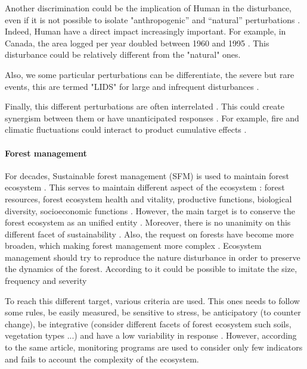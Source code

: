 \documentclass{article}
\begin{document}
Another discrimination could be the implication of Human in the disturbance, even if it is not possible to isolate "anthropogenic” and “natural” perturbations \cite{perera2015simulation}.
Indeed, Human have a direct impact increasingly important. For example, in Canada, the area logged per year doubled between 1960 and  1995 \cite{smith_canadas_2000}. This disturbance could be relatively different from the "natural" ones.

Also, we some particular perturbations can be differentiate, the severe but rare events, this are termed "LIDS" for large and infrequent disturbances \cite{foster1998landscape}.

Finally, this different perturbations are often interrelated \cite{keane2015exploring}. This could create synergism between them \cite{mandre_environmental_2011} or have  unanticipated responses \cite{perera2015simulation}. For example, fire and climatic fluctuations could interact to product cumulative effects \cite{romme2009historical}.



\paragraph{Forest management \\}
For decades, Sustainable forest management (SFM) is used to maintain forest ecosystem \cite{macdicken2015global}. This serves to maintain different aspect of the ecosystem : forest resources,  forest ecosystem health and vitality, productive functions, biological diversity, socioeconomic functions \cite{makela_using_2012}. However, the main target is to conserve the forest ecosystem as an unified entity \cite{franklin1989toward}.
Moreover, there is no unanimity on this different facet of sustainability \cite{martinez-vega_assessing_2016}. Also, the request on forests have become more broaden, which making forest management more complex \cite{eggers2017balancing}. Ecosystem management should try to reproduce the nature disturbance \cite{bengston_changing_1994} \cite{bengtsson2000biodiversity} in order to preserve the dynamics of the forest. According to \cite{hunter1990wildlife} \cite{hunter1988paleoecology} it could be possible to imitate the size, frequency and severity

To reach this different target, various criteria are used. This ones needs to follow some rules, be easily measured, be sensitive to stress, be anticipatory (to counter change), be integrative (consider different facets of forest ecosystem such soils, vegetation types ...) and have a low variability in response \cite{dale2001challenges}. However, according to the same article, monitoring programs are used to consider only few indicators and fails to account the complexity of the ecosystem.
\end{document}
